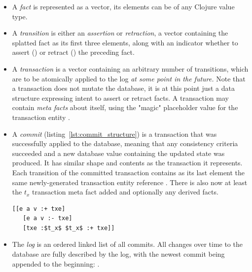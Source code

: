 \begin{itemize}
\item A \emph{fact} is represented as a vector, its elements can be of any Clojure value type.

\begin{center}
  \lisp{[e a v]}
\end{center}

\item A \emph{transition} is either an \emph{assertion} or \emph{retraction}, a vector containing the splatted fact as its first three elements, along with an indicator whether to assert (\lisp{:+}) or retract (\lisp{:-}) the preceding fact.

\begin{center}
  \lisp{[e a v :+]}
\end{center}

\item A \emph{transaction} is a vector containing an arbitrary number of transitions, which are to be atomically applied to the log \emph{at some point in the future.} Note that a transaction does not mutate the database, it is at this point just a data structure expressing intent to assert or retract facts. A transaction may contain \emph{meta facts} about itself, using the "magic" placeholder value for the transaction entity .

\begin{center}
  \lisp{[[e a v :-] [e a v :+] [:tx-meta a v :+]]}
\end{center}


\item A \emph{commit} (listing~\ref{lst:commit_structure}) is a transaction that was successfully applied to the database, meaning that any consistency criteria succeeded and a new database value containing the updated state was produced. It has similar shape and contents as the transaction it represents. Each transition of the committed transaction contains as its last element the same newly-generated transaction entity reference . There is also now at least the $t_x$ transaction meta fact added and optionally any derived facts.

\begin{lstlisting}[label={lst:commit_structure},morekeywords={:+,:-,txe},caption=Structure of a commit]
  [[e a v :+ txe]
   [e a v :- txe]
   [txe :$t_x$ $t_x$ :+ txe]]
\end{lstlisting}

\item The \emph{log} is an ordered linked list of all commits. All changes over time to the database are fully described by the log, with the newest commit being appended to the beginning: .


\end{itemize}
